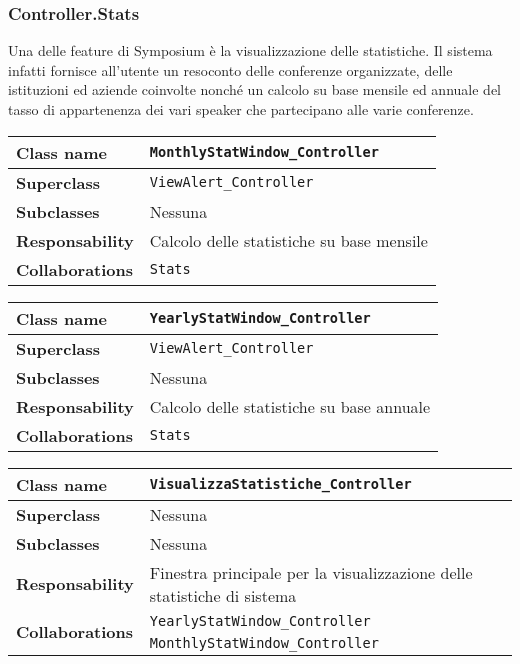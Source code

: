\subsubsection{Controller.Stats}
Una delle feature di Symposium è la visualizzazione delle statistiche. Il sistema infatti fornisce all'utente un resoconto delle conferenze organizzate, delle istituzioni ed aziende coinvolte nonché un calcolo su base mensile ed annuale del tasso di appartenenza dei vari speaker che partecipano alle varie conferenze.
\begin{table}[h!]
	\begin{tabular}{|l|l|}
		\hline 
		\textbf{Class name} & \texttt{MonthlyStatWindow\_Controller}
		\\ \hline
		\textbf{Superclass} & \texttt{ViewAlert\_Controller}
		\\ \hline
		\multirow{1}{*}{\textbf{Subclasses}} & Nessuna
		\\ \hline
		\textbf{Responsability} & Calcolo delle statistiche su base mensile
		\\ \hline
		\multirow{1}{*}{\textbf{Collaborations}} & \texttt{Stats} \\ \hline
	\end{tabular}
\end{table}
\begin{table}[h!]
	\begin{tabular}{|l|l|}
		\hline 
		\textbf{Class name} & \texttt{YearlyStatWindow\_Controller}
		\\ \hline
		\textbf{Superclass} & \texttt{ViewAlert\_Controller}
		\\ \hline
		\multirow{1}{*}{\textbf{Subclasses}} & Nessuna
		\\ \hline
		\textbf{Responsability} & Calcolo delle statistiche su base annuale
		\\ \hline
		\multirow{1}{*}{\textbf{Collaborations}} & \texttt{Stats }\\ \hline
	\end{tabular}
\end{table}
\begin{table}[h!]
	\begin{tabular}{|l|l|}
		\hline 
		\textbf{Class name} & \texttt{VisualizzaStatistiche\_Controller}
		\\ \hline
		\textbf{Superclass} & Nessuna
		\\ \hline
		\multirow{1}{*}{\textbf{Subclasses}} & Nessuna
		\\ \hline
		\textbf{Responsability} & Finestra principale per la visualizzazione delle statistiche di sistema
		\\ \hline
		\multirow{2}{*}{\textbf{Collaborations}} & \texttt{YearlyStatWindow\_Controller} \\
		& \texttt{MonthlyStatWindow\_Controller} \\ \hline
	\end{tabular}
\end{table}

